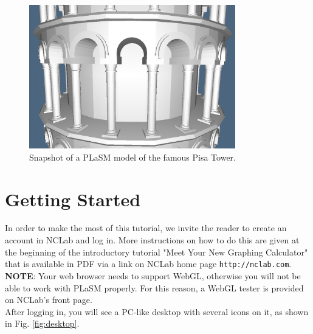 \documentclass[article,A4,12pt]{llncs}
\begin{document}
\begin{figure}[!ht]
\begin{center}
\includegraphics[width=0.8\textwidth]{img/pisa.png}
\end{center}
\vspace{-2mm}
\caption{Snapshot of a PLaSM model of the famous Pisa Tower.}
\label{fig:pisa}
\end{figure}

\section{Getting Started}

In order to make the most of this tutorial, we invite the 
reader to create an account in NCLab and log in. More instructions 
on how to do this are given at the beginning of the introductory 
tutorial "Meet Your New Graphing Calculator" that is available in 
PDF via a link on NCLab home page {\tt http://nclab.com}. \\

\noindent
{\bf NOTE}: Your web browser needs to support WebGL, otherwise you will not be able to 
work with PLaSM properly. For this reason, a WebGL tester is provided 
on NCLab's front page.\\

\noindent
After logging in, you will see a PC-like desktop with several icons on it,
as shown in Fig. \ref{fig:desktop}. 
\end{document}
